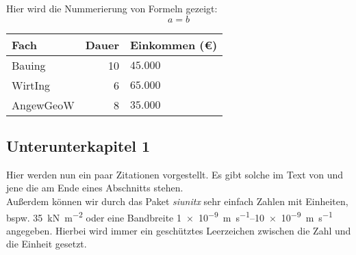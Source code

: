 	Hier wird die Nummerierung von Formeln gezeigt:
	\begin{equation}
		a=b
	\end{equation}
	
	\begin{table}
		\label{tbl:tabularx}
		\centering
		\begin{tabularx}{8cm}{lrX} 
			\toprule
			Fach & Dauer & Einkommen (€)\\ 
			\midrule 
			Bauing & 10 & $45.000$ \\
			WirtIng & 6 & $65.000$ \\
			AngewGeoW & 8 & $35.000$\\ 
			\bottomrule
		\end{tabularx}
	\end{table}


\subsection{Unterunterkapitel 1}
	Hier werden nun ein paar Zitationen vorgestellt. Es gibt solche im Text von \textcite{alam_effects_2014} und jene die am Ende eines Abschnitts stehen. \parencites{bailey_technology_2018}{alam_effects_2014}{dassault_systemes_abaqus_2017}{dassault_systemes_abaqus_2019}
	\\
	\cite{richardson_permeability_1987}
	Außerdem können wir durch das Paket \emph{siunitx} sehr einfach Zahlen mit Einheiten, bspw.	\SI{35}{\kilo\newton\per\square\meter} oder eine Bandbreite \SIrange{1e-9}{10e-9}{\meter\per\second} angegeben. Hierbei wird immer ein geschütztes Leerzeichen zwischen die Zahl und die Einheit gesetzt.
	
	\blindtext \parencite{alireza_hassanzadegan_thermomechanical_2012}